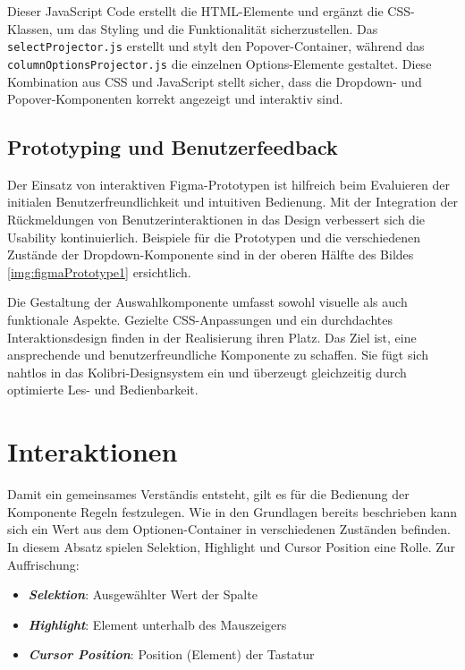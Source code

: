 Dieser JavaScript Code erstellt die HTML-Elemente und ergänzt die CSS-Klassen, um das Styling und die Funktionalität sicherzustellen. 
Das \texttt{selectProjector.js} erstellt und stylt den Popover-Container, während das \texttt{columnOptionsProjector.js} die einzelnen Options-Elemente gestaltet.
Diese Kombination aus CSS und JavaScript stellt sicher, dass die Dropdown- und Popover-Komponenten korrekt angezeigt und interaktiv sind.


\subsection{Prototyping und Benutzerfeedback}
\label{sec:userFeedbackPtototyping}

Der Einsatz von interaktiven Figma-Prototypen ist hilfreich beim Evaluieren der initialen Benutzerfreundlichkeit und intuitiven Bedienung. 
Mit der Integration der Rückmeldungen von Benutzerinteraktionen in das Design verbessert sich die Usability kontinuierlich.
Beispiele für die Prototypen und die verschiedenen Zustände der Dropdown-Komponente sind in der oberen Hälfte des Bildes \ref{img:figmaPrototype1} ersichtlich.

Die Gestaltung der Auswahlkomponente umfasst sowohl visuelle als auch funktionale Aspekte. 
Gezielte CSS-Anpassungen und ein durchdachtes Interaktionsdesign finden in der Realisierung ihren Platz. 
Das Ziel ist, eine ansprechende und benutzerfreundliche Komponente zu schaffen. 
Sie fügt sich nahtlos in das Kolibri-Designsystem ein und überzeugt gleichzeitig durch optimierte Les- und Bedienbarkeit.


\section{Interaktionen}
\label{sec:interaction}

Damit ein gemeinsames Verständis entsteht, gilt es für die Bedienung der Komponente Regeln festzulegen.
Wie in den Grundlagen bereits beschrieben kann sich ein Wert aus dem Optionen-Container in verschiedenen Zuständen befinden.
In diesem Absatz spielen Selektion, Highlight und Cursor Position eine Rolle.
Zur Auffrischung: 

\begin{itemize}
    \item \textbf{\emph{Selektion}}: Ausgewählter Wert der Spalte
    \item \textbf{\emph{Highlight}}: Element unterhalb des Mauszeigers
    \item \textbf{\emph{Cursor Position}}: Position (Element) der Tastatur
\end{itemize}

